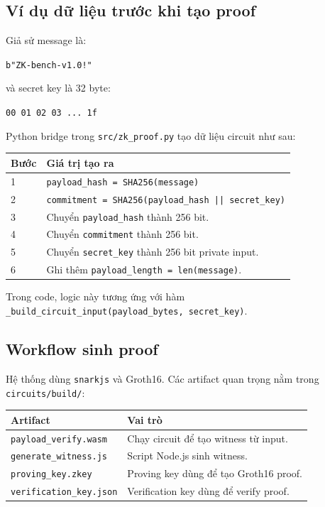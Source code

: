\documentclass[11pt,a4paper]{article}
\begin{document}
\subsection{Ví dụ dữ liệu trước khi tạo proof}

Giả sử message là:

\begin{center}
\texttt{b"ZK-bench-v1.0!"}
\end{center}

và secret key là 32 byte:

\begin{center}
\texttt{00 01 02 03 ... 1f}
\end{center}

Python bridge trong \texttt{src/zk\_proof.py} tạo dữ liệu circuit như sau:

\begin{center}
\begin{tabular}{lp{95mm}}
\toprule
Bước & Giá trị tạo ra \\
\midrule
1 & \texttt{payload\_hash = SHA256(message)} \\
2 & \texttt{commitment = SHA256(payload\_hash || secret\_key)} \\
3 & Chuyển \texttt{payload\_hash} thành 256 bit. \\
4 & Chuyển \texttt{commitment} thành 256 bit. \\
5 & Chuyển \texttt{secret\_key} thành 256 bit private input. \\
6 & Ghi thêm \texttt{payload\_length = len(message)}. \\
\bottomrule
\end{tabular}
\end{center}

Trong code, logic này tương ứng với hàm
\texttt{\_build\_circuit\_input(payload\_bytes, secret\_key)}.

\subsection{Workflow sinh proof}

Hệ thống dùng \texttt{snarkjs} và Groth16. Các artifact quan trọng nằm trong
\texttt{circuits/build/}:

\begin{center}
\begin{tabular}{lp{88mm}}
\toprule
Artifact & Vai trò \\
\midrule
\texttt{payload\_verify.wasm} & Chạy circuit để tạo witness từ input. \\
\texttt{generate\_witness.js} & Script Node.js sinh witness. \\
\texttt{proving\_key.zkey} & Proving key dùng để tạo Groth16 proof. \\
\texttt{verification\_key.json} & Verification key dùng để verify proof. \\
\bottomrule
\end{tabular}
\end{center}
\end{document}
